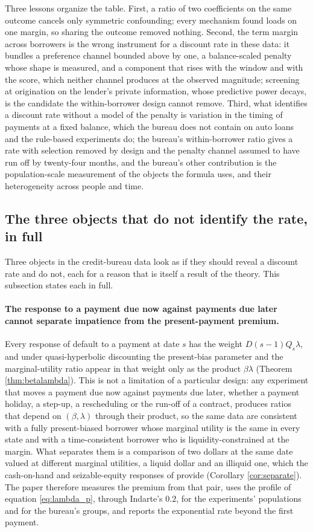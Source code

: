 Three lessons organize the table. First, a ratio of two coefficients on the same outcome cancels only symmetric confounding; every mechanism found loads on one margin, so sharing the outcome removed nothing. Second, the term margin across borrowers is the wrong instrument for a discount rate in these data: it bundles a preference channel bounded above by one, a balance-scaled penalty whose shape is measured, and a component that rises with the window and with the score, which neither channel produces at the observed magnitude; screening at origination on the lender's private information, whose predictive power decays, is the candidate the within-borrower design cannot remove. Third, what identifies a discount rate without a model of the penalty is variation in the timing of payments at a fixed balance, which the bureau does not contain on auto loans and the rule-based experiments do; the bureau's within-borrower ratio gives a rate with selection removed by design and the penalty channel assumed to have run off by twenty-four months, and the bureau's other contribution is the population-scale measurement of the objects the formula uses, and their heterogeneity across people and time.

\subsection{The three objects that do not identify the rate, in full}\label{appendix:strategies:three}

Three objects in the credit-bureau data look as if they should reveal a discount rate and do not, each for a reason that is itself a result of the theory. This subsection states each in full.

\paragraph{The response to a payment due now against payments due later cannot separate impatience from the present-payment premium.} Every response of default to a payment at date $s$ has the weight $D(s-1)Q_s\lambda$, and under quasi-hyperbolic discounting the present-bias parameter and the marginal-utility ratio appear in that weight only as the product $\beta\lambda$ (Theorem \ref{thm:betalambda}). This is not a limitation of a particular design: any experiment that moves a payment due now against payments due later, whether a payment holiday, a step-up, a rescheduling or the run-off of a contract, produces ratios that depend on $(\beta, \lambda)$ through their product, so the same data are consistent with a fully present-biased borrower whose marginal utility is the same in every state and with a time-consistent borrower who is liquidity-constrained at the margin. What separates them is a comparison of two dollars at the same date valued at different marginal utilities, a liquid dollar and an illiquid one, which the cash-on-hand and seizable-equity responses of \citet{indarte_moral_2023} provide (Corollary \ref{cor:separate}). The paper therefore measures the premium from that pair, uses the profile of equation \eqref{eq:lambda_p}, through Indarte's $0.2$, for the experiments' populations and for the bureau's groups, and reports the exponential rate beyond the first payment.

